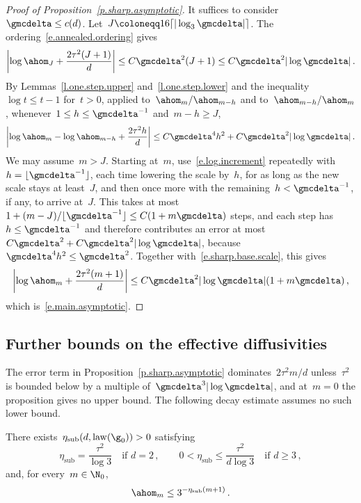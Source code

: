 \documentclass[11pt]{amsart}
\begin{document}
\begin{proof}[Proof of Proposition~\ref{p.sharp.asymptotic}]
	It suffices to consider~$\gmcdelta\leq c(d)$.  Let~$J\coloneqq16\lceil|\log_3\gmcdelta|\rceil$. The ordering~\eqref{e.annealed.ordering} gives
	\begin{equation}
		\left|\log\ahom_J+\frac{2\tau^2(J+1)}{d}\right|
		\leq C\gmcdelta^2(J+1)
		\leq C\gmcdelta^2|\log\gmcdelta|\,.
		\label{e.sharp.base.scale}
	\end{equation}
	By Lemmas~\ref{l.one.step.upper} and~\ref{l.one.step.lower} and the inequality~$\log t\leq t-1$ for~$t>0$, applied to~$\ahom_m/\ahom_{m-h}$ and to~$\ahom_{m-h}/\ahom_m$, whenever~$1\leq h\leq\gmcdelta^{-1}$ and~$m-h\geq J$,
	\begin{equation}
		\biggl|\log\ahom_m - \log\ahom_{m-h} + \frac{2\tau^2 h}{d}\biggr| \leq C\gmcdelta^4 h^2 + C\gmcdelta^2|\log\gmcdelta|\,.
		\label{e.log.increment}
	\end{equation}
	We may assume~$m>J$.  Starting at~$m$, use~\eqref{e.log.increment} repeatedly with~$h=\lfloor\gmcdelta^{-1}\rfloor$, each time lowering the scale by~$h$, for as long as the new scale stays at least~$J$, and then once more with the remaining~$h<\gmcdelta^{-1}$, if any, to arrive at~$J$.  This takes at most~$1+(m-J)/\lfloor\gmcdelta^{-1}\rfloor\leq C(1+m\gmcdelta)$ steps, and each step has~$h\leq\gmcdelta^{-1}$ and therefore contributes an error at most~$C\gmcdelta^2+C\gmcdelta^2|\log\gmcdelta|$, because~$\gmcdelta^4h^2\leq\gmcdelta^2$.  Together with~\eqref{e.sharp.base.scale}, this gives
	\begin{equation*}
		\left|\log\ahom_m+\frac{2\tau^2(m+1)}{d}\right|
		\leq
		C\gmcdelta^2|\log\gmcdelta|(1+m\gmcdelta)\,,
	\end{equation*}
	which is~\eqref{e.main.asymptotic}.
\end{proof}

\subsection{Further bounds on the effective diffusivities}

The error term in Proposition~\ref{p.sharp.asymptotic} dominates~$2\tau^2m/d$ unless~$\tau^2$ is bounded below by a multiple of~$\gmcdelta^3|\log\gmcdelta|$, and at~$m=0$ the proposition gives no upper bound. The following decay estimate assumes no such lower bound.

\begin{proposition}
	\label{p.homogenized.coefficient.strict.decay}
	There exists~$\eta_{\mathrm{sub}}(d,\operatorname{law}(\g_0))>0$ satisfying
	\begin{equation}
		\eta_{\mathrm{sub}}=\frac{\tau^2}{\log3}\quad\text{if }d=2\,,
		\qquad
		0<\eta_{\mathrm{sub}}\leq\frac{\tau^2}{d\log3}
		\quad\text{if }d\geq3\,,
		\label{e.strict.decay.eta.range}
	\end{equation}
	and, for every~$m\in\N_0$,
	\begin{equation}
		\ahom_m
		\leq
		3^{-\eta_{\mathrm{sub}}(m+1)}\,.
		\label{e.homogenized.coefficient.strict.decay}
	\end{equation}
\end{proposition}
\end{document}
